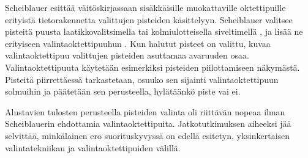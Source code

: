 Scheiblauer esittää väitöskirjassaan sisäkkäisille muokattaville oktettipuille erityistä tietorakennetta valittujen pisteiden käsittelyyn. Scheiblauer valitsee pisteitä puusta laatikkovalitsimella tai kolmiulotteisella siveltimellä , ja lisää ne erityiseen valintaoktettipuuhun . Kun halutut pisteet on valittu, kuvaa valintaoktettipuu valittujen pisteiden asuttamaa avaruuden osaa. Valintaoktettipuuta käytetään esimerkiksi pisteiden piilottamiseen näkymästä. Pisteitä piirrettäessä tarkastetaan, osuuko sen sijainti valintaoktettipuun solmuihin ja päätetään sen perusteella, hylätäänkö piste vai ei. \cite{scheiblauer}

Alustavien tulosten perusteella pisteiden valinta oli riittävän nopeaa ilman Scheiblauerin ehdottamia valintaoktettipuita. Jatkotutkimuksen aiheeksi jää selvittää, minkälainen ero suorituskyvyssä on edellä esitetyn, yksinkertaisen valintatekniikan ja valintaoktettipuiden välillä.